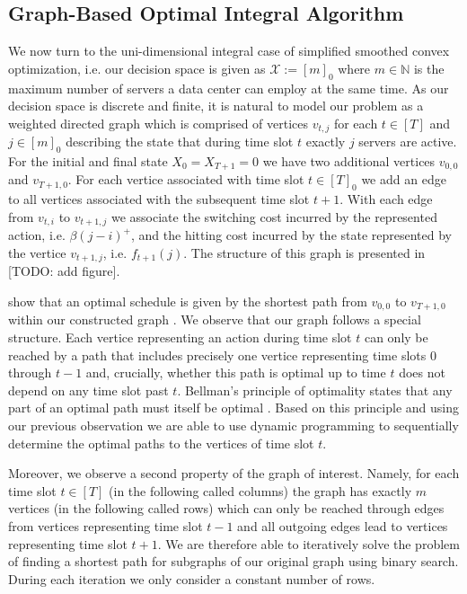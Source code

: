 \subsection{Graph-Based Optimal Integral Algorithm}\label{section:offline_algorithms:ud:graph_based}

We now turn to the uni-dimensional integral case of simplified smoothed convex optimization, i.e. our decision space is given as $\mathcal{X} := [m]_0$ where $m \in \mathbb{N}$ is the maximum number of servers a data center can employ at the same time. As our decision space is discrete and finite, it is natural to model our problem as a weighted directed graph which is comprised of vertices $v_{t,j}$ for each $t \in [T]$ and $j \in [m]_0$ describing the state that during time slot $t$ exactly $j$ servers are active. For the initial and final state $X_0 = X_{T+1} = 0$ we have two additional vertices $v_{0,0}$ and $v_{T+1,0}$. For each vertice associated with time slot $t \in [T]_0$ we add an edge to all vertices associated with the subsequent time slot $t + 1$. With each edge from $v_{t,i}$ to $v_{t+1,j}$ we associate the switching cost incurred by the represented action, i.e. $\beta (j - i)^+$, and the hitting cost incurred by the state represented by the vertice $v_{t+1,j}$, i.e. $f_{t+1}(j)$. The structure of this graph is presented in [TODO: add figure].

\citeauthor*{Albers2018} show that an optimal schedule is given by the shortest path from $v_{0,0}$ to $v_{T+1,0}$ within our constructed graph \cite{Albers2018}. We observe that our graph follows a special structure. Each vertice representing an action during time slot $t$ can only be reached by a path that includes precisely one vertice representing time slots $0$ through $t - 1$ and, crucially, whether this path is optimal up to time $t$ does not depend on any time slot past $t$. Bellman's principle of optimality states that any part of an optimal path must itself be optimal \cite{Bellman1954}. Based on this principle and using our previous observation we are able to use dynamic programming to sequentially determine the optimal paths to the vertices of time slot $t$.

Moreover, we observe a second property of the graph of interest. Namely, for each time slot $t \in [T]$ (in the following called columns) the graph has exactly $m$ vertices (in the following called rows) which can only be reached through edges from vertices representing time slot $t - 1$ and all outgoing edges lead to vertices representing time slot $t + 1$. We are therefore able to iteratively solve the problem of finding a shortest path for subgraphs of our original graph using binary search. During each iteration we only consider a constant number of rows.

